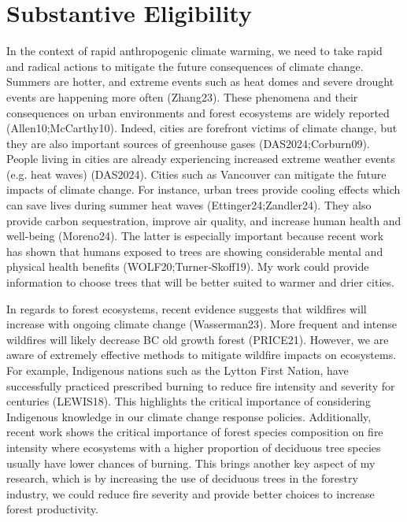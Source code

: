 \documentclass[11pt,letter]{article}
\begin{document}
\section *{Substantive Eligibility} 
In the context of rapid anthropogenic climate warming, we need to take rapid and radical actions to mitigate the future consequences of climate change. Summers are hotter, and extreme events such as heat domes and severe drought events are happening more often (Zhang23). These phenomena and their consequences on urban environments and forest ecosystems are widely reported (Allen10;McCarthy10). Indeed, cities are forefront victims of climate change, but they are also important sources of greenhouse gases (DAS2024;Corburn09). People living in cities are already experiencing increased extreme weather events (e.g. heat waves) (DAS2024). Cities such as Vancouver can mitigate the future impacts of climate change. For instance, urban trees provide cooling effects which can save lives during summer heat waves (Ettinger24;Zandler24). They also provide carbon sequestration, improve air quality, and increase human health and well-being (Moreno24). The latter is especially important because recent work has shown that humans exposed to trees are showing considerable mental and physical health benefits (WOLF20;Turner‐Skoff19). My work could provide information to choose trees that will be better suited to warmer and drier cities. 
\par
In regards to forest ecosystems, recent evidence suggests that wildfires will increase with ongoing climate change (Wasserman23). More frequent and intense wildfires will likely decrease BC old growth forest (PRICE21). However, we are aware of extremely effective methods to mitigate wildfire impacts on ecosystems. For example, Indigenous nations such as the Lytton First Nation, have successfully practiced prescribed burning to reduce fire intensity and severity for centuries (LEWIS18). This highlights the critical importance of considering Indigenous knowledge in our climate change response policies. Additionally, recent work shows the critical importance of forest species composition on fire intensity where ecosystems with a higher proportion of deciduous tree species usually have lower chances of burning. This brings another key aspect of my research, which is by increasing the use of deciduous trees in the forestry industry, we could reduce fire severity and provide better choices to increase forest productivity. %


\end{document}
